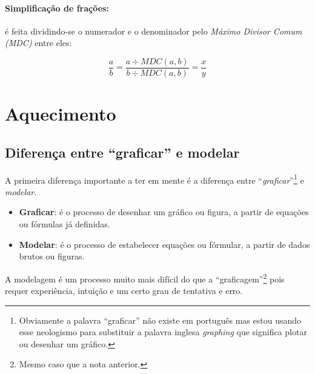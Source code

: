 \documentclass[pdftex, brazil, 12pt, twoside]{article}
\begin{document}
\paragraph{Simplificação de frações:} é feita dividindo-se o numerador e o denominador pelo
\emph{Máximo Divisor Comum (MDC)} entre eles:

\begin{equation*}
  \frac{a}{b} = \frac{a \div MDC(a,b)}{b \div MDC(a,b)} = \frac{x}{y}
\end{equation*}




\section{Aquecimento}
\label{aquecimento}

\subsection{Diferença entre ``graficar'' e modelar}
\label{aquecimento-graficar-modelar}

A primeira diferença importante a ter em mente é a diferença entre ``\emph{graficar}''\footnote{Obviamente
  a palavra ``graficar'' não existe em português mas estou usando esse neologismo para substituir
  a palavra inglesa \emph{graphing} que significa plotar ou desenhar um gráfico.} e \emph{modelar}.

\begin{itemize}
\item \textbf{Graficar}: é o processo de desenhar um gráfico ou figura, a partir de equações
  ou fórmulas já definidas.
\item \textbf{Modelar}: é o processo de estabelecer equações ou fórmular, a partir de dados
  brutos ou figuras.
\end{itemize}

A modelagem é um processo muito mais difícil do que a ``graficagem''\footnote{Mesmo caso que a nota anterior.}
pois requer experiência, intuição e um certo grau de tentativa e erro.

\end{document}
